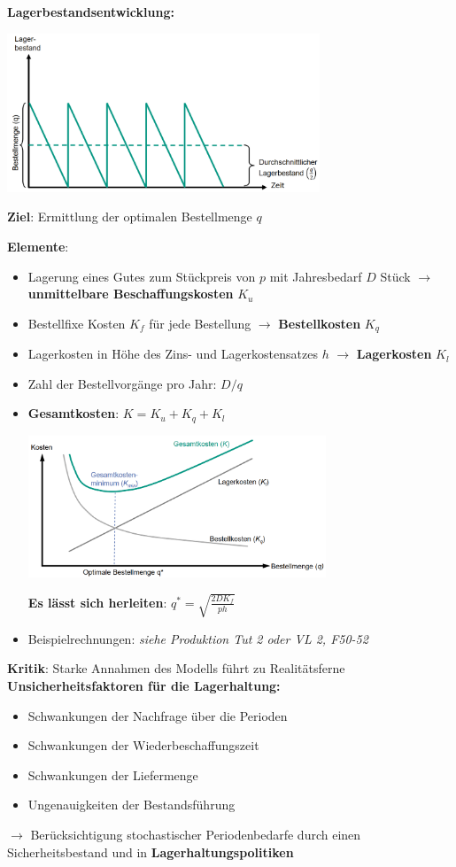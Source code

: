 \textbf{Lagerbestandsentwicklung:}
\begin{center}
	\includegraphics[width=0.7\textwidth]{images/lagerbestandsentwicklung.png}
\end{center}
\textbf{Ziel}: Ermittlung der optimalen Bestellmenge $q$

\textbf{Elemente}: 
\begin{itemize}
	\item Lagerung eines Gutes zum Stückpreis von $p$ mit Jahresbedarf $D$ Stück $\rightarrow$ \textbf{unmittelbare Beschaffungskosten} $K_u$
	\item Bestellfixe Kosten $K_f$ für jede Bestellung $\rightarrow$ \textbf{Bestellkosten} $K_q$
	\item Lagerkosten in Höhe des Zins- und Lagerkostensatzes $h$ $\rightarrow$ \textbf{Lagerkosten} $K_l$
	\item Zahl der Bestellvorgänge pro Jahr: $D/q$
	\item \textbf{Gesamtkosten}: $K=K_u+K_q+K_l$
	\begin{center}
		\includegraphics[width=0.7\textwidth]{images/haa.png}
	\end{center}
	\textbf{Es lässt sich herleiten}: $q^*=\sqrt{\frac{2DK_f}{ph}}$
	\item Beispielrechnungen: \textit{siehe Produktion Tut 2 oder VL 2, F50-52}
\end{itemize}

\textbf{Kritik}: Starke Annahmen des Modells führt zu Realitätsferne\\

\textbf{Unsicherheitsfaktoren für die Lagerhaltung:} 
\begin{itemize}
	\item Schwankungen der Nachfrage über die Perioden
	\item Schwankungen der Wiederbeschaffungszeit
	\item Schwankungen der Liefermenge
	\item Ungenauigkeiten der Bestandsführung
\end{itemize}
$\rightarrow$ Berücksichtigung stochastischer Periodenbedarfe durch einen
Sicherheitsbestand und in \textbf{Lagerhaltungspolitiken}

